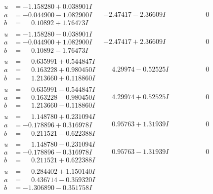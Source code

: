 \documentclass[1p]{elsarticle_modified}
\theoremstyle{definition}
\begin{document}
$$\begin{array}{c|c|c}
\begin{aligned}
u &= -1.158280 + 0.038901 I \\
a &= -0.044900 - 1.082900 I \\
b &= \phantom{-}0.10892 + 1.76473 I\end{aligned}
 & -2.47417 - 2.36609 I & \phantom{-0.000000 } 0 \\ \hline\begin{aligned}
u &= -1.158280 - 0.038901 I \\
a &= -0.044900 + 1.082900 I \\
b &= \phantom{-}0.10892 - 1.76473 I\end{aligned}
 & -2.47417 + 2.36609 I & \phantom{-0.000000 } 0 \\ \hline\begin{aligned}
u &= \phantom{-}0.635991 + 0.544847 I \\
a &= \phantom{-}0.163228 + 0.980450 I \\
b &= \phantom{-}1.213660 + 0.118860 I\end{aligned}
 & \phantom{-}4.29974 - 0.52525 I & \phantom{-0.000000 } 0 \\ \hline\begin{aligned}
u &= \phantom{-}0.635991 - 0.544847 I \\
a &= \phantom{-}0.163228 - 0.980450 I \\
b &= \phantom{-}1.213660 - 0.118860 I\end{aligned}
 & \phantom{-}4.29974 + 0.52525 I & \phantom{-0.000000 } 0 \\ \hline\begin{aligned}
u &= \phantom{-}1.148780 + 0.231094 I \\
a &= -0.178896 + 0.316978 I \\
b &= \phantom{-}0.211521 - 0.622388 I\end{aligned}
 & \phantom{-}0.95763 + 1.31939 I & \phantom{-0.000000 } 0 \\ \hline\begin{aligned}
u &= \phantom{-}1.148780 - 0.231094 I \\
a &= -0.178896 - 0.316978 I \\
b &= \phantom{-}0.211521 + 0.622388 I\end{aligned}
 & \phantom{-}0.95763 - 1.31939 I & \phantom{-0.000000 } 0 \\ \hline\begin{aligned}
u &= \phantom{-}0.284402 + 1.150140 I \\
a &= \phantom{-}0.436714 - 0.359320 I \\
b &= -1.306890 - 0.351758 I\end{aligned}

\end{array}$$
\end{document}
